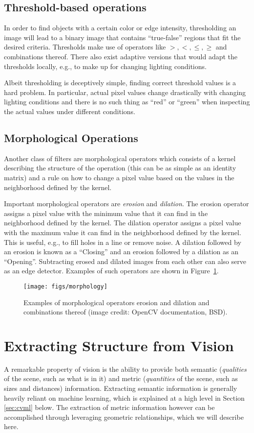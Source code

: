 \subsection{Threshold-based operations}
In order to find objects with a certain color or edge intensity, thresholding an image will lead to a binary image that contains ``true-false'' regions that fit the desired criteria. Thresholds make use of operators like $>,<,\leq,\geq$ and combinations thereof. There also exist adaptive versions that would adapt the thresholds locally, e.g., to make up for changing lighting conditions.

Albeit thresholding is deceptively simple, finding correct threshold values is a hard problem. In particular, actual pixel values change drastically with changing lighting conditions and there is no such thing as ``red'' or ``green'' when inspecting the actual values under different conditions.

\subsection{Morphological Operations}
Another class of filters are morphological operators which consists of a kernel describing the structure of the operation (this can be as simple as an identity matrix) and a rule on how to change a pixel value based on the values in the neighborhood defined by the kernel.

Important morphological operators are \emph{erosion} and \emph{dilation}. The erosion operator assigns a pixel value with the minimum value that it can find in the neighborhood defined by the kernel. The dilation operator assigns a pixel value with the maximum value it can find in the neighborhood defined by the kernel. This is useful, e.g., to fill holes in a line or remove noise. A dilation followed by an erosion is known as a ``Closing'' and an erosion followed by a dilation as an ``Opening''. Subtracting erosed and dilated images from each other can also serve as an edge detector. Examples of such operators are shown in Figure~\ref{fig:morphology}.

\begin{figure}
    \centering
    \texttt{[image: figs/morphology]}
    \caption{Examples of morphological operators erosion and dilation and combinations thereof (image credit: OpenCV documentation, BSD).
    \label{fig:morphology}}
\end{figure}

\section{Extracting Structure from Vision}
A remarkable property of vision is the ability to provide both semantic (\emph{qualities} of the scene, such as what is in it) and metric (\emph{quantities} of the scene, such as sizes and distances) information. Extracting semantic information is generally heavily reliant on machine learning, which is explained at a high level in Section \ref{sec:cvml} below. The extraction of metric information however can be accomplished through leveraging geometric relationships, which we will describe here.

